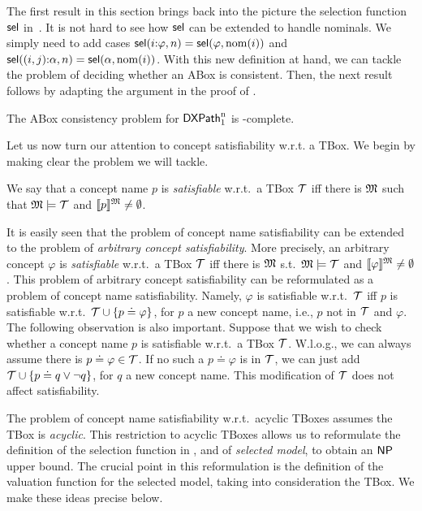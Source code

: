 The first result in this section brings back into the picture the selection function $\operatorname{\mathsf{sel}}$ in~.
It is not hard to see how $\operatorname{\mathsf{sel}}$ can be extended to handle nominals. We simply need to add cases $\operatorname{\mathsf{sel}}(i{:}\varphi, n) = \operatorname{\mathsf{sel}}(\varphi,\operatorname{nom}(i))$ and $\operatorname{\mathsf{sel}}((i,j){:}\alpha, n) = \operatorname{\mathsf{sel}}(\alpha,\operatorname{nom}(i))$. With this new definition at hand, we can tackle the problem of deciding whether an ABox is consistent. Then, the next result follows by adapting the argument in the proof of .

\begin{theorem}\label{th:abox-xp-np}
    The ABox consistency problem for $\mathsf{DXPath}_{\rm 1}^{\rm n}$ is \np-complete.
\end{theorem}

Let us now turn our attention to concept satisfiability w.r.t. a TBox.
We begin by making clear the problem we will tackle.

\begin{definition}
    We say that a concept name $p$ is \emph{satisfiable} w.r.t.\ a TBox $\mathcal{T}$ iff there is $\mathfrak{M}$ such that $\mathfrak{M}\models\mathcal{T}$ and $\llbracket{p}\rrbracket^{\mathfrak{M}}\neq\emptyset$.
\end{definition}

It is easily seen that the problem of concept name satisfiability can be extended to the problem of \emph{arbitrary concept satisfiability}.
More precisely, an arbitrary concept $\varphi$ is \emph{satisfiable} w.r.t.\ a TBox $\mathcal{T}$ iff there is  $\mathfrak{M}$ s.t.\ $\mathfrak{M}\models\mathcal{T}$ and $\llbracket{\varphi}\rrbracket^{\mathfrak{M}}\neq\emptyset$.
This problem of arbitrary concept satisfiability can be reformulated as a problem of concept name satisfiability.
Namely, $\varphi$ is satisfiable w.r.t.\ $\mathcal{T}$ iff $p$ is satisfiable w.r.t.\ $\mathcal{T} \cup \{p \doteq \varphi\}$, for $p$ a new concept name, i.e., $p$ not in $\mathcal{T}$ and $\varphi$.
The following observation is also important.
Suppose that we wish to check whether a concept name $p$ is satisfiable w.r.t.\ a TBox $\mathcal{T}$.
W.l.o.g., we can always assume there is ${p \doteq \varphi} \in \mathcal{T}$.
If no such a $p \doteq \varphi$ is in $\mathcal{T}$, we can just add $\mathcal{T} \cup \{p \doteq q \lor \lnot q\}$, for $q$ a new concept name. This modification of $\mathcal{T}$ does not affect satisfiability.

The problem of concept name satisfiability w.r.t.\ acyclic TBoxes assumes the TBox is \emph{acyclic}.
This restriction to acyclic TBoxes allows us to reformulate the definition of the selection function in , and of \emph{selected model}, to obtain an $\textsf{NP}$ upper bound.
The crucial point in this reformulation is the definition of the valuation function for the selected model, taking into consideration the TBox. 
We make these ideas precise below.

